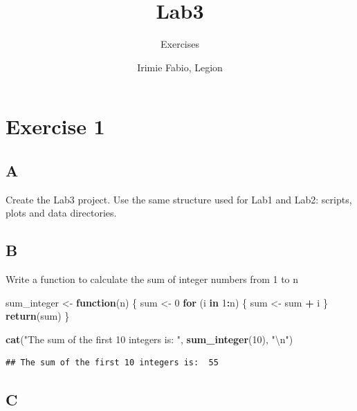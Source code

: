 \documentclass[
]{article}
\title{Lab3}
\subtitle{Exercises}
\author{Irimie Fabio, Legion}
\date{}
\newenvironment{Shaded}{\begin{snugshade}}{\end{snugshade}}
\newcommand{\CharTok}[1]{\textcolor[rgb]{0.31,0.60,0.02}{#1}}
\newcommand{\ControlFlowTok}[1]{\textcolor[rgb]{0.13,0.29,0.53}{\textbf{#1}}}
\newcommand{\DecValTok}[1]{\textcolor[rgb]{0.00,0.00,0.81}{#1}}
\newcommand{\KeywordTok}[1]{\textcolor[rgb]{0.13,0.29,0.53}{\textbf{#1}}}
\newcommand{\NormalTok}[1]{#1}
\newcommand{\OperatorTok}[1]{\textcolor[rgb]{0.81,0.36,0.00}{\textbf{#1}}}
\newcommand{\StringTok}[1]{\textcolor[rgb]{0.31,0.60,0.02}{#1}}
\begin{document}
\maketitle

{
\setcounter{tocdepth}{2}
\tableofcontents
}
\hypertarget{exercise-1}{%
\section{Exercise 1}\label{exercise-1}}

\hypertarget{a}{%
\subsection{A}\label{a}}

Create the Lab3 project. Use the same structure used for Lab1 and Lab2:
scripts, plots and data directories.

\hypertarget{b}{%
\subsection{B}\label{b}}

Write a function to calculate the sum of integer numbers from 1 to n

\begin{Shaded}
\begin{Highlighting}[]
\NormalTok{sum\_integer \textless{}{-}}\StringTok{ }\ControlFlowTok{function}\NormalTok{(n) \{}
\NormalTok{  sum \textless{}{-}}\StringTok{ }\DecValTok{0}
  \ControlFlowTok{for}\NormalTok{ (i }\ControlFlowTok{in} \DecValTok{1}\OperatorTok{:}\NormalTok{n) \{}
\NormalTok{    sum \textless{}{-}}\StringTok{ }\NormalTok{sum }\OperatorTok{+}\StringTok{ }\NormalTok{i}
\NormalTok{  \}}
  \KeywordTok{return}\NormalTok{(sum)}
\NormalTok{\}}

\KeywordTok{cat}\NormalTok{(}\StringTok{"The sum of the first 10 integers is: "}\NormalTok{, }\KeywordTok{sum\_integer}\NormalTok{(}\DecValTok{10}\NormalTok{), }\StringTok{"}\CharTok{\textbackslash{}n}\StringTok{"}\NormalTok{)}
\end{Highlighting}
\end{Shaded}

\begin{verbatim}
## The sum of the first 10 integers is:  55
\end{verbatim}

\hypertarget{c}{%
\subsection{C}\label{c}}
\end{document}
